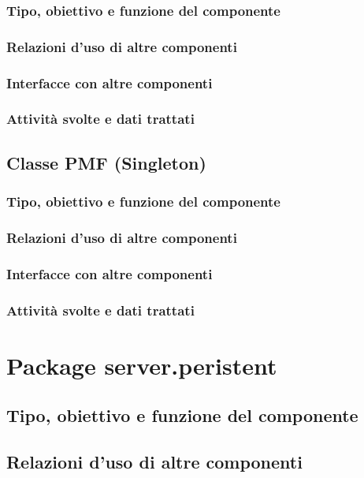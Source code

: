 \subsubsection*{Tipo, obiettivo e funzione del componente}
\subsubsection*{Relazioni d'uso di altre componenti}
\subsubsection*{Interfacce con altre componenti}
\subsubsection*{Attivit\`a svolte e dati trattati}

\newpage
\subsection{Classe PMF (Singleton)}
\subsubsection*{Tipo, obiettivo e funzione del componente}
\subsubsection*{Relazioni d'uso di altre componenti}
\subsubsection*{Interfacce con altre componenti}
\subsubsection*{Attivit\`a svolte e dati trattati}

\section{Package server.peristent} %
\subsection*{Tipo, obiettivo e funzione del componente}
\subsection*{Relazioni d'uso di altre componenti}
